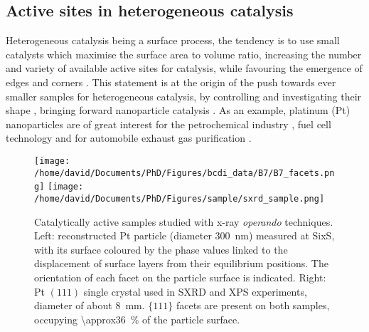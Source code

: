 \subsection{Active sites in heterogeneous catalysis}

Heterogeneous catalysis being a surface process, the tendency is to use small catalysts which maximise the surface area to volume ratio, increasing the number and variety of available active sites for catalysis, while favouring the emergence of edges and corners \parencite{Zambelli1996, Hendriksen2010, Vogt2022}.
This statement is at the origin of the push towards ever smaller samples for heterogeneous catalysis, by controlling and investigating their shape \parencite{Lee2006, Tian2007, Bratlie2007, Lee2009}, bringing forward nanoparticle catalysis \parencite{Che1989, Raimondi2005, Arico2005, Molenbroek2009, VanSanten2010, Schauermann2013}.
As an example, platinum (Pt) nanoparticles are of great interest for the petrochemical industry \parencite{Astruc2005, Astruc2020}, fuel cell technology and for automobile exhaust gas purification \parencite{Heck2001}.

\begin{figure}[!htb]
    \centering
    \texttt{[image: /home/david/Documents/PhD/Figures/bcdi\_data/B7/B7\_facets.png]}
    \texttt{[image: /home/david/Documents/PhD/Figures/sample/sxrd\_sample.png]}
    \caption{
        Catalytically active samples studied with x-ray \textit{operando} techniques.
        Left: reconstructed Pt particle (diameter \qty{300}{\nm}) measured at SixS, with its surface coloured by the phase values linked to the displacement of surface layers from their equilibrium positions.
        The orientation of each facet on the particle surface is indicated.
        Right: Pt $(111)$ single crystal used in SXRD and XPS experiments, diameter of about \qty{8}{\mm}.
        $\{111\}$ facets are present on both samples, occupying \qty{\approx36}{\percent} of the particle surface.
    }
    \label{fig:Samples}
\end{figure}

